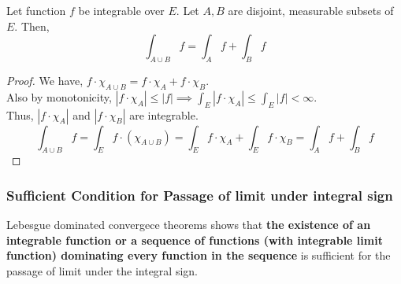 \begin{theorem}
	Let function $f$ be integrable over $E$.
	Let $A,B$ are disjoint, measurable subsets of $E$.
	Then,
	\begin{equation}
		\int_{A \cup B} f = \int_A f + \int_B f
	\end{equation}
\end{theorem}
\begin{proof}
	We have, $f \cdot \chi_{A \cup B} = f \cdot \chi_A + f \cdot \chi_B$.\\
	Also by monotonicity, $\displaystyle |f \cdot \chi_A| \le |f| \implies \int_E |f \cdot \chi_A| \le \int_E |f| < \infty$.\\
	Thus, $|f \cdot \chi_A|$ and $|f \cdot \chi_B|$ are integrable.
	\begin{equation*}
		\int_{A \cup B} f =  \int_{E} f \cdot (\chi_{A \cup B}) = \int_E f \cdot \chi_A + \int_E f \cdot \chi_B = \int_A f + \int_B f
	\end{equation*}
\end{proof}

\subsubsection{Sufficient Condition for Passage of limit under integral sign}
	Lebesgue dominated convergece theorems shows that \textbf{the existence of an integrable function or a sequence of functions (with integrable limit function) dominating every function in the sequence} is sufficient for the passage of limit under the integral sign.

